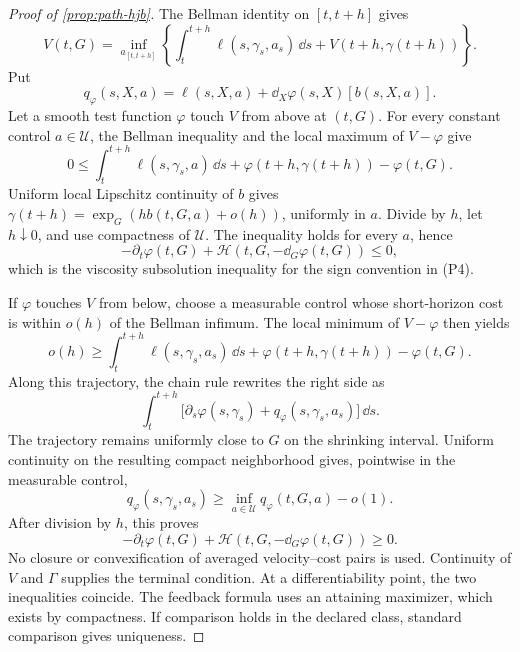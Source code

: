 \begin{proof}[Proof of \cref{prop:path-hjb}]
The Bellman identity on \([t,t+h]\) gives
\[
  V(t,G)=
  \inf_{a_{[t,t+h]}}
  \left\{
  \int_t^{t+h}\ell(s,\gamma_s,a_s)\,\dd s
  +V(t+h,\gamma(t+h))
  \right\}.
\]
  Put
  \[
    q_\varphi(s,X,a)
    =\ell(s,X,a)+\dd_X\varphi(s,X)[b(s,X,a)].
  \]
  Let a smooth test function \(\varphi\) touch \(V\) from above at \((t,G)\).
  For every constant control \(a\in\mathcal U\), the Bellman inequality and the
  local maximum of \(V-\varphi\) give
  \[
    0\le
    \int_t^{t+h}\ell(s,\gamma_s,a)\,\dd s
    +\varphi(t+h,\gamma(t+h))-\varphi(t,G).
  \]
  Uniform local Lipschitz continuity of \(b\) gives
  \(\gamma(t+h)=\exp_G(hb(t,G,a)+o(h))\), uniformly in \(a\).  Divide by
  \(h\), let \(h\downarrow0\), and use compactness of \(\mathcal U\).  The
  inequality holds for every \(a\), hence
  \[
    -\partial_t\varphi(t,G)
    +\mathcal H(t,G,-\dd_G\varphi(t,G))\le0,
  \]
  which is the viscosity subsolution inequality for the sign convention in
  (P4).

  If \(\varphi\) touches \(V\) from below, choose a measurable control whose
  short-horizon cost is within \(o(h)\) of the Bellman infimum.  The local
  minimum of \(V-\varphi\) then yields
  \[
    o(h)\ge
    \int_t^{t+h}\ell(s,\gamma_s,a_s)\,\dd s
    +\varphi(t+h,\gamma(t+h))-\varphi(t,G).
  \]
  Along this trajectory, the chain rule rewrites the right side as
  \[
    \int_t^{t+h}
    \bigl[\partial_s\varphi(s,\gamma_s)
    +q_\varphi(s,\gamma_s,a_s)\bigr]\,\dd s.
  \]
  The trajectory remains uniformly close to \(G\) on the shrinking interval.
  Uniform continuity on the resulting compact neighborhood gives, pointwise in
  the measurable control,
  \[
    q_\varphi(s,\gamma_s,a_s)
    \ge \inf_{a\in\mathcal U}q_\varphi(t,G,a)-o(1).
  \]
  After division by \(h\), this proves
  \[
    -\partial_t\varphi(t,G)
    +\mathcal H(t,G,-\dd_G\varphi(t,G))\ge0.
  \]
  No closure or convexification of averaged velocity--cost pairs is used.
  Continuity of \(V\) and \(\Gamma\) supplies the terminal condition.  At a
  differentiability point, the two inequalities coincide.  The feedback
  formula uses an attaining maximizer, which exists by compactness.  If
  comparison holds in the declared class, standard comparison gives
  uniqueness.
\end{proof}

